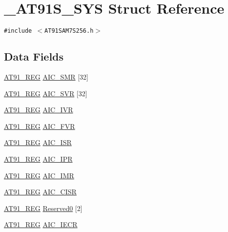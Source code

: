 \hypertarget{struct__AT91S__SYS}{
\section{\_\-AT91S\_\-SYS Struct Reference}
\label{struct__AT91S__SYS}
}
{\tt \#include $<$AT91SAM7S256.h$>$}

\subsection*{Data Fields}
\begin{CompactItemize}
\item 
\hyperlink{AT91SAM7X256_8h_712ad5a1ac1bd02f3e95a7526c283ce1}{AT91\_\-REG} \hyperlink{struct__AT91S__SYS_6b2dc25fefb6a43c8839d3a0ba85a408}{AIC\_\-SMR} \mbox{[}32\mbox{]}
\item 
\hyperlink{AT91SAM7X256_8h_712ad5a1ac1bd02f3e95a7526c283ce1}{AT91\_\-REG} \hyperlink{struct__AT91S__SYS_1b583e863c3624110adb15846ef78427}{AIC\_\-SVR} \mbox{[}32\mbox{]}
\item 
\hyperlink{AT91SAM7X256_8h_712ad5a1ac1bd02f3e95a7526c283ce1}{AT91\_\-REG} \hyperlink{struct__AT91S__SYS_24e5233d7ec9c2daed8dc29aeac22ce1}{AIC\_\-IVR}
\item 
\hyperlink{AT91SAM7X256_8h_712ad5a1ac1bd02f3e95a7526c283ce1}{AT91\_\-REG} \hyperlink{struct__AT91S__SYS_2d92f48e5b842c2c77f134b979fd2bc7}{AIC\_\-FVR}
\item 
\hyperlink{AT91SAM7X256_8h_712ad5a1ac1bd02f3e95a7526c283ce1}{AT91\_\-REG} \hyperlink{struct__AT91S__SYS_ed4a9f739e52edf7c7815f458799b6e4}{AIC\_\-ISR}
\item 
\hyperlink{AT91SAM7X256_8h_712ad5a1ac1bd02f3e95a7526c283ce1}{AT91\_\-REG} \hyperlink{struct__AT91S__SYS_f420a7282f407323cc7d796699c0720b}{AIC\_\-IPR}
\item 
\hyperlink{AT91SAM7X256_8h_712ad5a1ac1bd02f3e95a7526c283ce1}{AT91\_\-REG} \hyperlink{struct__AT91S__SYS_e0ed0c0a3132843b4059265489ee2063}{AIC\_\-IMR}
\item 
\hyperlink{AT91SAM7X256_8h_712ad5a1ac1bd02f3e95a7526c283ce1}{AT91\_\-REG} \hyperlink{struct__AT91S__SYS_571a3b496f349c04d930abbb45adf942}{AIC\_\-CISR}
\item 
\hyperlink{AT91SAM7X256_8h_712ad5a1ac1bd02f3e95a7526c283ce1}{AT91\_\-REG} \hyperlink{struct__AT91S__SYS_1f98f1e8266ffb2aa5ac1cba0f4ce0d4}{Reserved0} \mbox{[}2\mbox{]}
\item 
\hyperlink{AT91SAM7X256_8h_712ad5a1ac1bd02f3e95a7526c283ce1}{AT91\_\-REG} \hyperlink{struct__AT91S__SYS_2f6e0a16409471a92afa7209566ceae5}{AIC\_\-IECR}

\end{CompactItemize}
